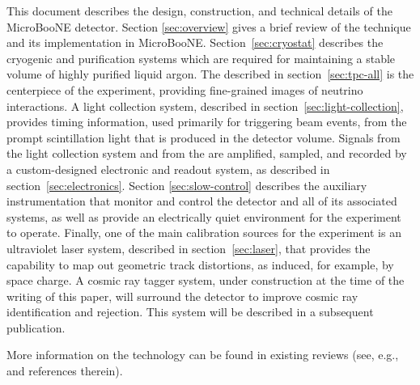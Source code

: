  

This document describes the design, construction, and technical details of the MicroBooNE detector.  Section \ref{sec:overview} gives a brief review of the \lartpc technique and its implementation in MicroBooNE.  Section~\ref{sec:cryostat} describes the cryogenic and purification systems which are required for maintaining a stable volume of highly purified liquid argon.  The \lartpc described in section~\ref{sec:tpc-all} is the centerpiece of the experiment, providing fine-grained images of neutrino interactions.  A light collection system, described in section~\ref{sec:light-collection}, provides timing information, used primarily for triggering beam events, from the prompt scintillation light that is produced in the detector volume. Signals from the light collection system and from the \lartpc are amplified, sampled, and recorded by a custom-designed electronic and readout system, as described in section~\ref{sec:electronics}.  Section \ref{sec:slow-control} describes the auxiliary instrumentation that monitor and control the detector and all of its associated systems, as well as provide an electrically quiet environment for the experiment to operate. Finally, one of the main calibration sources for the experiment is an ultraviolet laser system, described in section~\ref{sec:laser}, that provides the capability to map out geometric track distortions, as induced, for example, by space charge.  A cosmic ray tagger system, under construction at the time of the writing of this paper, will surround the detector to improve cosmic ray identification and rejection.  This system will be described in a subsequent publication.  

More information on the \lartpc technology can be found in existing reviews (see, e.g.,~\cite{Marchionni:2013} and references therein).
